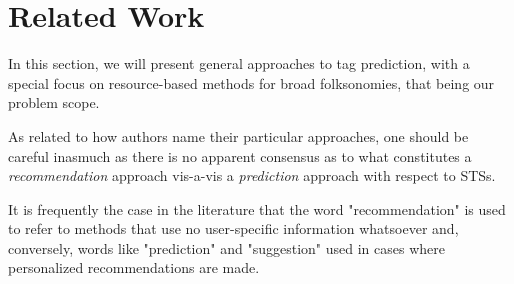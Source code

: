 \chapter{Related Work}\label{chap:related_work}


In this section, we will present general approaches to tag prediction, with a special focus on resource-based  methods for broad folksonomies, that being our problem scope.


As related to how authors name their particular approaches, one should be careful inasmuch as there is no apparent consensus as to what constitutes a \textit{recommendation} approach vis-a-vis a \textit{prediction} approach with respect to STSs. 

It is frequently the case in the literature that the word "recommendation" is used to refer to methods that use no user-specific information whatsoever and, conversely, words like "prediction" and "suggestion" used in cases where personalized recommendations are made.






